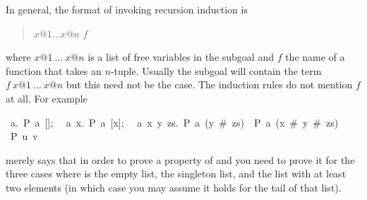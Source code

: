\begin{isabellebody}
\begin{isamarkuptext}
In general, the format of invoking recursion induction is
\begin{quote}
$x@1 \dots x@n$  $f$
\end{quote}%
where $x@1~\dots~x@n$ is a list of free variables in the subgoal and $f$ the
name of a function that takes an $n$-tuple. Usually the subgoal will
contain the term $f~x@1~\dots~x@n$ but this need not be the case. The
induction rules do not mention $f$ at all. For example 
\begin{isabelle}
{\isasymlbrakk}~{\isasymAnd}a.~P~a~[];\isanewline
~~{\isasymAnd}a~x.~P~a~[x];\isanewline
~~{\isasymAnd}a~x~y~zs.~P~a~(y~\#~zs)~{\isasymLongrightarrow}~P~a~(x~\#~y~\#~zs){\isasymrbrakk}\isanewline
{\isasymLongrightarrow}~P~u~v%
\end{isabelle}
merely says that in order to prove a property  of  and
 you need to prove it for the three cases where  is the
empty list, the singleton list, and the list with at least two elements
(in which case you may assume it holds for the tail of that list).%
\end{isamarkuptext}%
\end{isabellebody}%
